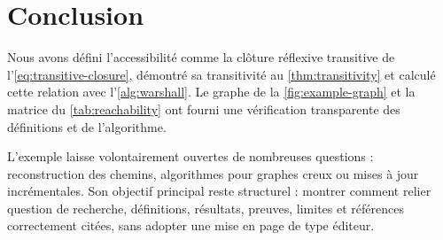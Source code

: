 \chapter{Conclusion}
\label{ch:conclusion}


Nous avons défini l'accessibilité comme la clôture réflexive transitive de
l'\cref{eq:transitive-closure}, démontré sa transitivité au
\cref{thm:transitivity} et calculé cette relation avec
l'\cref{alg:warshall}. Le graphe de la \cref{fig:example-graph} et la matrice du
\cref{tab:reachability} ont fourni une vérification transparente
des définitions et de l'algorithme.

L'exemple laisse volontairement ouvertes de nombreuses questions : reconstruction
des chemins, algorithmes pour graphes creux ou mises à jour incrémentales. Son
objectif principal reste structurel : montrer comment relier question de
recherche, définitions, résultats, preuves, limites et références correctement
citées, sans adopter une mise en page de type éditeur.
